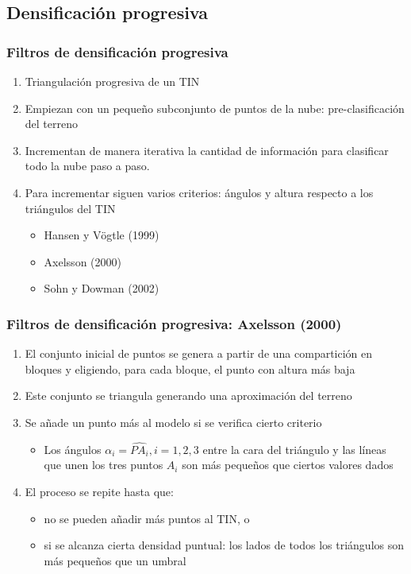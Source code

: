 \subsection{Densificación progresiva}
\begin{frame}
  \frametitle{Filtros de densificación progresiva}
  \begin{enumerate}
    \item Triangulación progresiva de un TIN 
    \item Empiezan con un pequeño subconjunto de puntos de la nube: pre-clasificación del terreno
    \item Incrementan de manera iterativa la cantidad de información para
      clasificar todo la nube paso a paso.
    \item Para incrementar siguen varios criterios: ángulos y altura respecto a
      los triángulos del TIN
      \begin{itemize}
        \item Hansen y Vögtle (1999)
        \item Axelsson (2000)
        \item Sohn y Dowman (2002)
      \end{itemize}
  \end{enumerate}
\end{frame}
\begin{frame}
  \frametitle{Filtros de densificación progresiva: Axelsson (2000)}
  \begin{enumerate}
    \item El conjunto inicial de puntos se genera a partir de una compartición
      en bloques y eligiendo, para cada bloque, el punto con altura más baja
    \item Este conjunto se triangula generando una aproximación del terreno
    \item Se añade un punto más al modelo si se verifica cierto criterio
      \begin{itemize}
        \item Los ángulos $\alpha_i = \widehat{PA_i}, i=1,2,3$ entre la cara del
          triángulo y las líneas que unen los tres puntos $A_i$ son más pequeños
          que ciertos valores dados
      \end{itemize}
    \item El proceso se repite hasta que:
      \begin{itemize}
        \item no se pueden añadir más puntos al TIN, o
        \item si se alcanza cierta densidad puntual: los lados de todos los
          triángulos son más pequeños que un umbral
      \end{itemize}
  \end{enumerate}
\end{frame}
